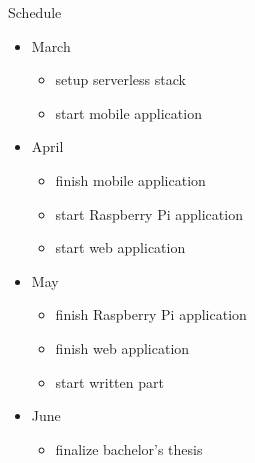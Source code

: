 \documentclass[aspectratio=1610]{beamer}
\begin{document}
  \begin{frame}{Schedule}
    \begin{itemize}
      \item March
        \begin{itemize}
          \item setup serverless stack
          \item start mobile application
        \end{itemize}
      \item April
        \begin{itemize}
          \item finish mobile application
          \item start Raspberry Pi application
          \item start web application
        \end{itemize}
      \item May
        \begin{itemize}
          \item finish Raspberry Pi application
          \item finish web application
          \item start written part
        \end{itemize}
      \item June
        \begin{itemize}
          \item finalize bachelor’s thesis
        \end{itemize}
    \end{itemize}
  \end{frame}
\end{document}
